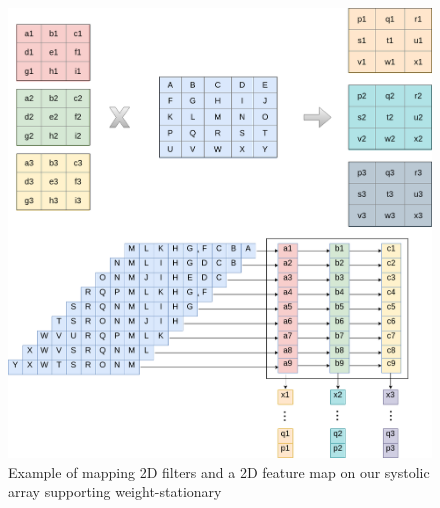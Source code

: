 \begin{figure}[h]
    \centering
    \includegraphics[scale=0.3]{images/convolution.png}
    \caption{Example of mapping 2D filters and a 2D feature map on our systolic array supporting weight-stationary}
    \label{fig:convolution}
\end{figure}

